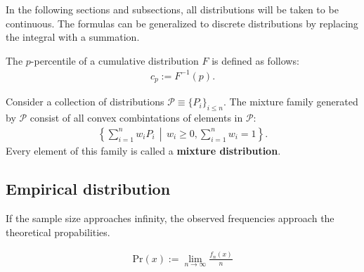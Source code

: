     In the following sections and subsections, all distributions will be taken to be continuous. The formulas can be generalized to discrete distributions by replacing the integral with a summation.

    \begin{definition}[Percentile]
        The $p$-percentile of a cumulative distribution $F$ is defined as follows:
        \begin{gather}
            c_p := F^{-1}(p).
        \end{gather}
    \end{definition}


    \begin{example}
        Consider a collection of distributions $\mathcal{P}\equiv\{P_i\}_{i\leq n}$. The mixture family generated by $\mathcal{P}$ consist of all convex combintations of elements in $\mathcal{P}$:
        \begin{gather}
            \left\{\sum_{i=1}^nw_iP_i\,\middle\vert\,w_i\geq0,\sum_{i=1}^nw_i = 1\right\}.
        \end{gather}
        Every element of this family is called a \textbf{mixture distribution}.
    \end{example}

\subsection{Empirical distribution}


    \begin{theorem}\label{statistics:large_numbers}
        If the sample size approaches infinity, the observed frequencies approach the theoretical propabilities.
    \end{theorem}
    \begin{result}
        \begin{gather}
            \label{statistics:frequentist_probability}
            \mathrm{Pr}(x) := \lim_{n\rightarrow\infty}\frac{f_n(x)}{n}
        \end{gather}
    \end{result}

